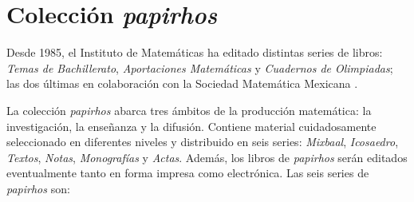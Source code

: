 
\frontmatter\pagestyle{empty}

\chapter{Colección \emph{papirhos}}

Desde 1985, el Instituto de Matemáticas ha editado distintas series de
libros: \emph{Temas de Bachillerato}, \emph{Aportaciones Matemáticas}
y \emph{Cuadernos de Olimpiadas}; las dos últimas en colaboración con
la Sociedad Matemática Mexicana
.  

La colección \emph{papirhos} abarca tres ámbitos de la
producción matemática: la investigación, la enseñanza y la
difusión. Contiene material cuidadosamente seleccionado en diferentes
niveles y distribuido en seis series: \emph{Mixbaal},
\emph{Icosaedro}, \emph{Textos}, \emph{Notas},
\emph{Monografías} y \emph{Actas}. Además, los libros de \emph{papirhos} serán
editados eventualmente tanto en forma impresa como electrónica.  Las seis series de
\emph{papirhos} son:
	

